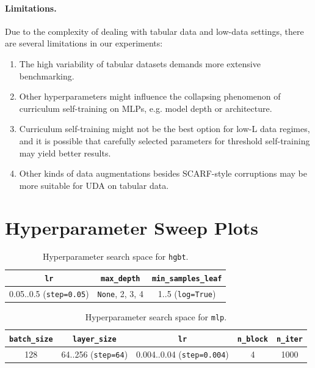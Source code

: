 \documentclass{article}
\begin{document}
\paragraph{Limitations.}
Due to the complexity of dealing with tabular data and low-data settings, there are
several limitations in our experiments: \begin{enumerate}
  \item The high variability of tabular datasets demands more extensive benchmarking.
  \item Other hyperparameters might influence the collapsing phenomenon of curriculum
  self-training on MLPs, e.g. model depth or architecture.
  \item Curriculum self-training might not be the best option for low-L data regimes,
  and it is possible that carefully selected parameters for threshold self-training may
  yield better results.
  \item Other kinds of data augmentations besides SCARF-style corruptions may be more
  suitable for UDA on tabular data.
\end{enumerate}

\printbibliography

\appendix

\section{Hyperparameter Sweep Plots}
\label{sec:hyperparams_sweep_plots}

\begin{table}[htbp]
  \centering
  \caption{Hyperparameter search space for \texttt{hgbt}.}
  \label{tab:hyperparams_spaces_hgbt}
  \small
  \begin{tabular}{ccc}
    \toprule
    \texttt{lr} & \texttt{max\_depth} & \small\texttt{min\_samples\_leaf} \\
    \midrule
    0.05..0.5 (\texttt{step=0.05})
    & \texttt{None}, 2, 3, 4
    & 1..5 (\texttt{log=True}) \\
    \bottomrule
  \end{tabular}
\end{table}

\begin{table}[htbp]
  \centering
  \caption{Hyperparameter search space for \texttt{mlp}.}
  \label{tab:hyperparams_spaces_mlp}
  \small
  \begin{tabular}{ccccc}
    \toprule
    \texttt{batch\_size} & \texttt{layer\_size} & \texttt{lr} & \texttt{n\_block} & \texttt{n\_iter} \\
    \midrule
    128
    & 64..256 (\texttt{step=64})
    & 0.004..0.04 (\texttt{step=0.004})
    & 4
    & 1000 \\
    \bottomrule
  \end{tabular}
\end{table}
\end{document}
